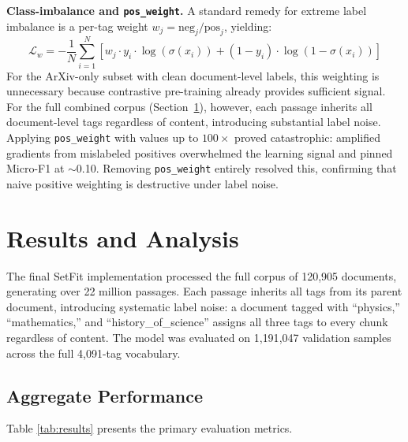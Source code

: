 \documentclass[10pt,journal,compsoc]{IEEEtran}
\newcommand{\TotalDocs}{120,905}
\newcommand{\TotalPassagesShort}{22 million}
\newcommand{\NumTags}{4,091}
\newcommand{\PosWeightMicroF}{0.10}
\newcommand{\PosWeightMax}{100}
\newcommand{\ValSamples}{1{,}191{,}047}
\begin{document}
	\textbf{Class-imbalance and \texttt{pos\_weight}.} A standard remedy for extreme label imbalance is a per-tag weight $w_j = \text{neg}_j / \text{pos}_j$, yielding:
	\begin{equation}
		\mathcal{L}_w = -\frac{1}{N} \sum_{i=1}^{N}
		[w_j \cdot y_i \cdot \log(\sigma(x_i)) + (1-y_i) \cdot \log(1-\sigma(x_i))]
	\end{equation}
	For the ArXiv-only subset with clean document-level labels, this weighting is unnecessary because contrastive pre-training already provides sufficient signal. For the full combined corpus (Section~\ref{sec:eval}), however, each passage inherits all document-level tags regardless of content, introducing substantial label noise. Applying \texttt{pos\_weight} with values up to $\PosWeightMax{}\times$ proved catastrophic: amplified gradients from mislabeled positives overwhelmed the learning signal and pinned Micro-F1 at $\sim$\PosWeightMicroF{}. Removing \texttt{pos\_weight} entirely resolved this, confirming that naive positive weighting is destructive under label noise.
	
	\section{Results and Analysis}
	\label{sec:eval}
	The final SetFit implementation processed the full corpus of \TotalDocs{} documents, generating over \TotalPassagesShort{} passages. Each passage inherits all tags from its parent document, introducing systematic label noise: a document tagged with ``physics,'' ``mathematics,'' and ``history\_of\_science'' assigns all three tags to every chunk regardless of content. The model was evaluated on \ValSamples{} validation samples across the full \NumTags{}-tag vocabulary.
	
	\subsection{Aggregate Performance}
	Table \ref{tab:results} presents the primary evaluation metrics.
	
\end{document}
